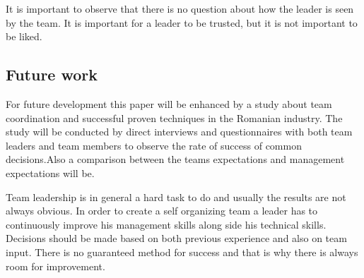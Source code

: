 It is important to observe that there is no question about how the leader is seen by the team. It is important for a leader to be trusted, but it is not important to be liked.

\subsection{Future work}

For future development this paper will be enhanced by a study about team coordination and successful proven techniques in the Romanian industry. The study will be conducted by direct interviews and questionnaires with both team leaders and team members to observe the rate of success of common decisions.Also a comparison between the teams expectations and management expectations will be.

Team leadership is in general a hard task to do and usually the results are not always obvious. In order to create a self organizing team a leader has to continuously improve his management skills along side his technical skills. Decisions should be made based on both previous experience and also on team input. There is no guaranteed method for success and that is why there is always room for improvement. 